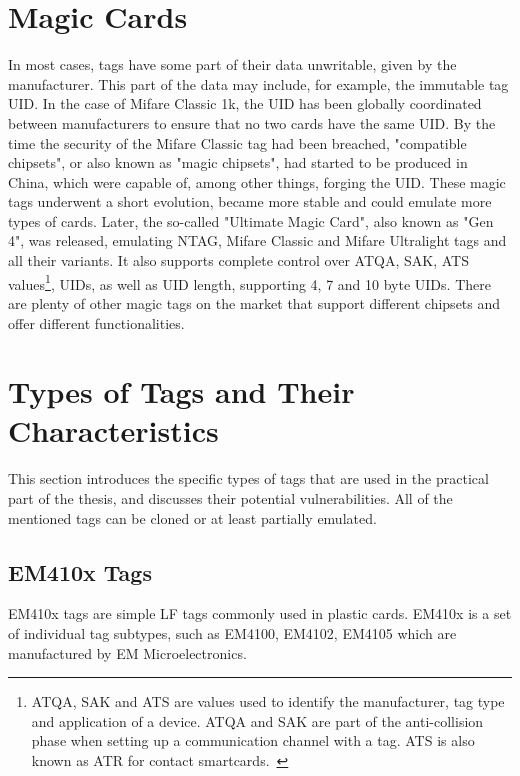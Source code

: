\section{Magic Cards}

In most cases, tags have some part of their data unwritable, given by the manufacturer. This part of the data may include, for example, the immutable tag UID. In the case of Mifare Classic 1k, the UID has been globally coordinated between manufacturers to ensure that no two cards have the same UID. By the time the security of the Mifare Classic tag had been breached, "compatible chipsets", or also known as "magic chipsets", had started to be produced in China, which were capable of, among other things, forging the UID. These magic tags underwent a short evolution, became more stable and could emulate more types of cards. Later, the so-called "Ultimate Magic Card", also known as "Gen 4", was released, emulating NTAG, Mifare Classic and Mifare Ultralight tags and all their variants.  It also supports complete control over ATQA, SAK, ATS values\footnote{ATQA, SAK and ATS are values used to identify the manufacturer, tag type and application of a device. ATQA and SAK are part of the anti-collision phase when setting up a communication channel with a tag. ATS is also known as ATR for contact smartcards.~\cite{atqavalues, identificationprocedure}}, UIDs, as well as UID length, supporting 4, 7 and 10 byte UIDs. There are plenty of other magic tags on the market that support different chipsets and offer different functionalities.~\cite{magiccards}


\section{Types of Tags and Their Characteristics}

This section introduces the specific types of tags that are used in the practical part of the thesis, and discusses their potential vulnerabilities. All of the mentioned tags can be cloned or at least partially emulated.


\subsection{EM410x Tags}

EM410x tags are simple LF tags commonly used in plastic cards. EM410x is a set of individual tag subtypes, such as EM4100, EM4102, EM4105 which are manufactured by EM Microelectronics.~\cite{krumnikl2015em410x}

